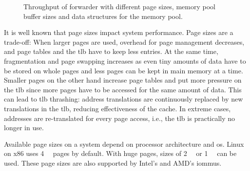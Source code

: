 \begin{figure}[!b]
	\centering
    \par
    \par

    \caption{Throughput of forwarder with different page sizes, memory pool
    buffer sizes and data structures for the memory pool.}
	\label{fig:page-size-throughput}
\end{figure}

It is well known that page sizes impact system performance. Page sizes are a
trade-off: When larger pages are used, overhead for page management decreases,
and page tables and the \ac{tlb} have to keep less entries. At the same time,
fragmentation and page swapping increases as even tiny amounts of data have to
be stored on whole pages and less pages can be kept in main memory at a time.
Smaller pages on the other hand increase page tables and put more pressure on
the \ac{tlb} since more pages have to be accessed for the same amount of data.
This can lead to \ac{tlb} thrashing: address translations are continuously
replaced by new translations in the \ac{tlb}, reducing effectiveness of the
cache. In extreme cases, addresses are re-translated for every page access,
i.e., the \ac{tlb} is practically no longer in use.

Available page sizes on a system depend on processor architecture and \ac{os}.
Linux on x86 uses \SI{4}{\kibi\byte} pages by default. With huge pages, sizes of
\SI{2}{\mebi\byte} or \SI{1}{\gibi\byte} can be used. These page sizes are also
supported by Intel's and AMD's \acp{iommu}.

